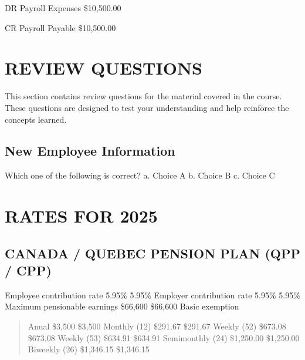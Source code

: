 \documentclass[letterpaper,10pt,english]{sphinxmanual}
\begin{document}
\begin{DUlineblock}{0em}
\item[] DR    Payroll Expenses    \$10,500.00
\item[]
\begin{DUlineblock}{\DUlineblockindent}
\item[] CR  Payroll Payable   \$10,500.00
\end{DUlineblock}
\end{DUlineblock}

\sphinxstepscope


\chapter{REVIEW QUESTIONS}
\label{\detokenize{review_questions:review-questions}}\label{\detokenize{review_questions::doc}}
\sphinxAtStartPar
This section contains review questions for the material covered in the course. These questions are designed to test your understanding and help reinforce the concepts learned.


\section{New Employee Information}
\label{\detokenize{review_questions:new-employee-information}}
\sphinxAtStartPar
Which one of the following is correct?
a. Choice A
b. Choice B
c. Choice C

\sphinxstepscope


\chapter{RATES FOR 2025}
\label{\detokenize{rates_2025:rates-for-2025}}\label{\detokenize{rates_2025::doc}}

\section{CANADA / QUEBEC PENSION PLAN (QPP / CPP)}
\label{\detokenize{rates_2025:canada-quebec-pension-plan-qpp-cpp}}
\sphinxAtStartPar
Employee contribution rate 5.95\% 5.95\%
Employer contribution rate 5.95\% 5.95\%
Maximum pensionable earnings \$66,600 \$66,600
Basic exemption
\begin{quote}

\sphinxAtStartPar
Anual \$3,500 \$3,500
Monthly (12) \$291.67 \$291.67
Weekly (52) \$673.08 \$673.08
Weekly (53) \$634.91 \$634.91
Semi\sphinxhyphen{}monthly (24) \$1,250.00 \$1,250.00
Bi\sphinxhyphen{}weekly (26) \$1,346.15 \$1,346.15
\end{quote}
\end{document}

